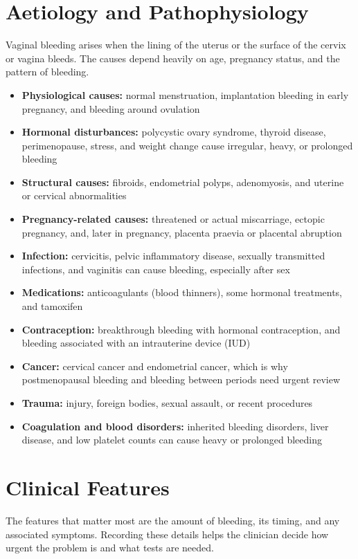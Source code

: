 \section*{Aetiology and Pathophysiology}
Vaginal bleeding arises when the lining of the uterus or the surface of the cervix or vagina bleeds. The causes depend heavily on age, pregnancy status, and the pattern of bleeding.

\begin{itemize}
    \item \textbf{Physiological causes:} normal menstruation, implantation bleeding in early pregnancy, and bleeding around ovulation
    \item \textbf{Hormonal disturbances:} polycystic ovary syndrome, thyroid disease, perimenopause, stress, and weight change cause irregular, heavy, or prolonged bleeding
    \item \textbf{Structural causes:} fibroids, endometrial polyps, adenomyosis, and uterine or cervical abnormalities
    \item \textbf{Pregnancy-related causes:} threatened or actual miscarriage, ectopic pregnancy, and, later in pregnancy, placenta praevia or placental abruption
    \item \textbf{Infection:} cervicitis, pelvic inflammatory disease, sexually transmitted infections, and vaginitis can cause bleeding, especially after sex
    \item \textbf{Medications:} anticoagulants (blood thinners), some hormonal treatments, and tamoxifen
    \item \textbf{Contraception:} breakthrough bleeding with hormonal contraception, and bleeding associated with an intrauterine device (IUD)
    \item \textbf{Cancer:} cervical cancer and endometrial cancer, which is why postmenopausal bleeding and bleeding between periods need urgent review
    \item \textbf{Trauma:} injury, foreign bodies, sexual assault, or recent procedures
    \item \textbf{Coagulation and blood disorders:} inherited bleeding disorders, liver disease, and low platelet counts can cause heavy or prolonged bleeding
\end{itemize}

\section*{Clinical Features}
The features that matter most are the amount of bleeding, its timing, and any associated symptoms. Recording these details helps the clinician decide how urgent the problem is and what tests are needed.


